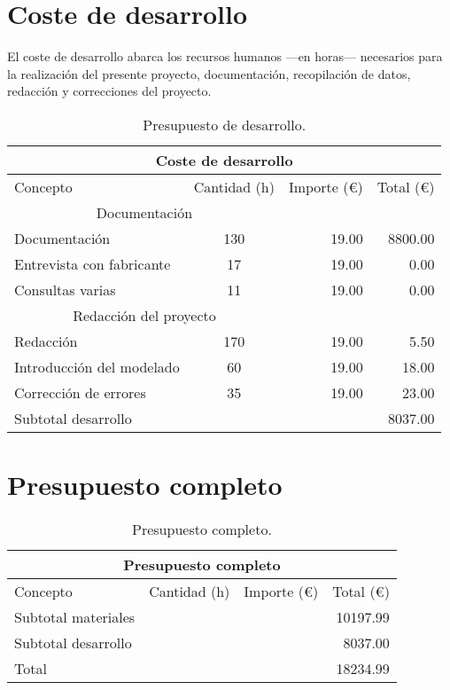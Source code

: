 \chapter{Coste de desarrollo}
El coste de desarrollo abarca los recursos humanos —en horas— necesarios para la realización del presente proyecto, documentación, recopilación de datos, redacción y correcciones del proyecto.

\begin{table}[!htb]
\centering
\begin{tabular}{lcrr}
\toprule
\multicolumn{4}{c}{Coste de desarrollo}\\
\midrule
Concepto & Cantidad (h) & Importe (\euro) & Total (\euro)\\
\midrule
\multicolumn{2}{c}{Documentación}\\
\cmidrule(r){1-2}
Documentación & 130 & 19.00 & 8800.00\\
Entrevista con fabricante & 17 & 19.00 & 0.00\\
Consultas varias & 11 & 19.00 & 0.00\\
\multicolumn{2}{c}{Redacción del proyecto}\\
\cmidrule(r){1-2}
Redacción & 170 & 19.00 & 5.50\\
Introducción del modelado & 60 & 19.00 & 18.00\\
Corrección de errores & 35 & 19.00 & 23.00\\
\bottomrule
Subtotal desarrollo & & & 8037.00\\
\bottomrule
\end{tabular}
\caption{Presupuesto de desarrollo.}
\label{presupuestodesarrollo}
\end{table}

\chapter{Presupuesto completo}

\begin{table}[!htb]
\centering
\begin{tabular}{lcrr}
\toprule
\multicolumn{4}{c}{Presupuesto completo}\\
\midrule
Concepto & Cantidad (h) & Importe (\euro) & Total (\euro)\\
\midrule
Subtotal materiales & & & 10197.99\\
Subtotal desarrollo & & & 8037.00\\
\bottomrule
Total & & & 18234.99\\
\bottomrule
\end{tabular}
\caption{Presupuesto completo.}
\label{presupuestocompleto}
\end{table}

